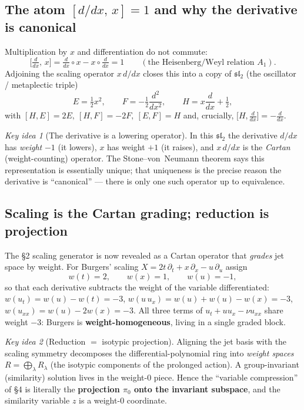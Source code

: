 \documentclass[11pt]{article}
\theoremstyle{definition}
\theoremstyle{remark}
\newtheorem*{keyidea}{Key idea}
\newcommand{\sltwo}{\mathfrak{sl}_2}
\begin{document}
\subsection{The atom \texorpdfstring{$[d/dx,\,x]=1$}{[d/dx,x]=1} and why the derivative is canonical}

Multiplication by $x$ and differentiation do not commute:
\[
\Big[\tfrac{d}{dx},\,x\Big]=\tfrac{d}{dx}\circ x-x\circ\tfrac{d}{dx}=1
\qquad(\text{the Heisenberg/Weyl relation }A_1).
\]
Adjoining the scaling operator $x\,d/dx$ closes this into a copy of $\sltwo$ (the oscillator /
metaplectic triple)
\[
E=\tfrac12 x^2,\qquad F=-\tfrac12\frac{d^2}{dx^2},\qquad H=x\frac{d}{dx}+\tfrac12,
\]
with $[H,E]=2E,\ [H,F]=-2F,\ [E,F]=H$ and, crucially,
$\big[H,\tfrac{d}{dx}\big]=-\tfrac{d}{dx}$.

\begin{keyidea}[The derivative is a lowering operator]
In this $\sltwo$ the derivative $d/dx$ has \emph{weight} $-1$ (it lowers), $x$ has weight $+1$ (it
raises), and $x\,d/dx$ is the \emph{Cartan} (weight-counting) operator. The Stone--von~Neumann theorem
says this representation is essentially unique; that uniqueness is the precise reason the derivative is
``canonical'' --- there is only one such operator up to equivalence.
\end{keyidea}

\subsection{Scaling is the Cartan grading; reduction is projection}

The \S2 scaling generator is now revealed as a Cartan operator that \emph{grades} jet space by weight.
For Burgers' scaling $X=2t\,\partial_t+x\,\partial_x-u\,\partial_u$ assign
\[
w(t)=2,\qquad w(x)=1,\qquad w(u)=-1,
\]
so that each derivative subtracts the weight of the variable differentiated:
$w(u_t)=w(u)-w(t)=-3$, $w(u\,u_x)=w(u)+w(u)-w(x)=-3$, $w(u_{xx})=w(u)-2w(x)=-3$. All three terms of
$u_t+uu_x-\nu u_{xx}$ share weight $-3$: Burgers is \textbf{weight-homogeneous}, living in a single
graded block.

\begin{keyidea}[Reduction $=$ isotypic projection]
Aligning the jet basis with the scaling symmetry decomposes the differential-polynomial ring into
\emph{weight spaces} $R=\bigoplus_\lambda R_\lambda$ (the isotypic components of the prolonged action).
A group-invariant (similarity) solution lives in the weight-$0$ piece. Hence the ``variable
compression'' of \S4 is literally the \textbf{projection $\pi_0$ onto the invariant subspace}, and the
similarity variable $z$ is a weight-$0$ coordinate.
\end{keyidea}
\end{document}
